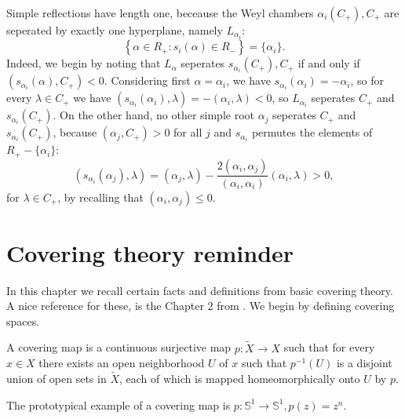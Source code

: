 \documentclass{report}
\begin{document}
\begin{example}
    Simple reflections have length one, beceause the Weyl chambers $\alpha_i(C_+), C_+$ are seperated by exactly one hyperplane, namely $L_{\alpha_i}$:
    \[
    \left\{ \alpha \in R_+ : s_i(\alpha) \in R_- \right\} = \{\alpha_i\}.
    \]
    Indeed, we begin by noting that $L_{\alpha}$ seperates $s_{\alpha_i}(C_+), C_+$ if and only if $(s_{\alpha_i}(\alpha), C_+) < 0$.
    Considering first $\alpha = \alpha_i$, we have $s_{\alpha_i}(\alpha_i) = -\alpha_i$, so for every $\lambda \in C_+$ we have $\left(s_{\alpha_i}(\alpha_i), \lambda\right) = -(\alpha_i, \lambda) < 0$, so $L_{\alpha_i}$ seperates $C_+$ and $s_{\alpha_i}(C_+)$.
    On the other hand, no other simple root $\alpha_j$ seperates $C_+$ and $s_{\alpha_i}(C_+)$, because $(\alpha_j, C_+) > 0$ for all $j$ and $s_{\alpha_i}$ permutes the elements of $R_+ - \{\alpha_i\}$:
    \[
    \left( s_{\alpha_i}(\alpha_j), \lambda \right) = (\alpha_j, \lambda) - \frac{2(\alpha_i, \alpha_j)}{(\alpha_i, \alpha_i)}(\alpha_i, \lambda) > 0,
    \]
    for $\lambda \in C_+$, by recalling that $(\alpha_i, \alpha_j) \leq 0$.
\end{example}

\appendix

\chapter{Covering theory reminder}
In this chapter we recall certain facts and definitions from basic covering theory.
A nice reference for these, is the Chapter 2 from \cite{hatcher2002topology}.
We begin by defining covering spaces.
\begin{definition}
    A covering map is a continuous surjective map $p: \tilde X \to X$ such that for every $x \in X$ there exists an open neighborhood $U$ of $x$ such that $p^{-1}(U)$ is a disjoint union of open sets in $\tilde X$, each of which is mapped homeomorphically onto $U$ by $p$.
\end{definition}
The prototypical example of a covering map is $p: \mathbb S^1 \to \mathbb S^1, p(z) = z^n$.
\end{document}
